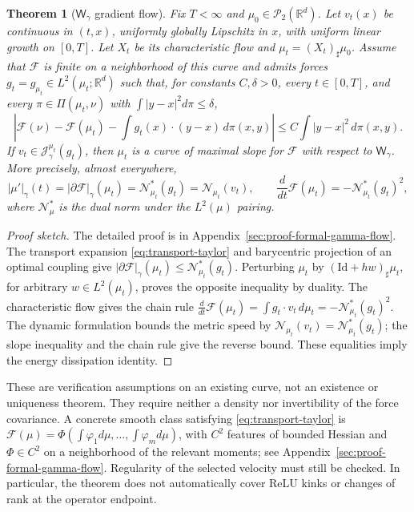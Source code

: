 \documentclass{article}
\newtheorem{theorem}{Theorem}[section]
\newenvironment{proofsketch}{\begin{proof}[Proof sketch]}{\end{proof}}
\newcommand{\R}{\mathbb{R}}
\newcommand{\cP}{\mathcal{P}}
\newcommand{\MF}{\mathcal{F}}
\newcommand{\MN}{\mathcal{N}}
\newcommand{\MJ}{\mathcal{J}}
\newcommand{\Wg}{\mathsf{W}_{\gamma}}
\newcommand{\Id}{\mathrm{Id}}
\begin{document}
\begin{theorem}[$\Wg$ gradient flow]
\label{prop:formalGF}
Fix $T<\infty$ and $\mu_0\in\cP_2(\R^d)$. Let $v_t(x)$ be continuous in
$(t,x)$, uniformly globally Lipschitz in $x$, with uniform linear growth on
$[0,T]$. Let $X_t$ be its characteristic flow and
$\mu_t=(X_t)_\sharp\mu_0$. Assume that $\MF$ is finite on a neighborhood of
this curve and admits forces $g_t=g_{\mu_t}\in L^2(\mu_t;\R^d)$ such that,
for constants $C,\delta>0$, every $t\in[0,T]$, and every
$\pi\in\Pi(\mu_t,\nu)$ with $\int|y-x|^2d\pi\le\delta$,
\begin{equation}\label{eq:transport-taylor}
 \left|\MF(\nu)-\MF(\mu_t)
       -\int g_t(x)\cdot(y-x)\,d\pi(x,y)\right|
 \le C\int|y-x|^2\,d\pi(x,y).
\end{equation}
If $v_t\in\MJ_\gamma^{\mu_t}(g_t)$, then $\mu_t$ is a curve of maximal
slope for $\MF$ with respect to $\Wg$. More precisely, almost everywhere,
\[
 |\mu'|_\gamma(t)=|\partial\MF|_\gamma(\mu_t)
 =\MN_{\mu_t}^*(g_t)=\MN_{\mu_t}(v_t),\qquad
 \frac{d}{dt}\MF(\mu_t)=-\MN_{\mu_t}^*(g_t)^2,
\]
where $\MN_\mu^*$ is the dual norm under the $L^2(\mu)$ pairing.
\end{theorem}


\begin{proofsketch}
The detailed proof is in Appendix~\ref{sec:proof-formal-gamma-flow}.
The transport expansion \eqref{eq:transport-taylor} and barycentric
projection of an optimal coupling give
$|\partial\MF|_\gamma(\mu_t)\le\MN_{\mu_t}^*(g_t)$.
Perturbing $\mu_t$ by $(\Id+hw)_\sharp\mu_t$, for arbitrary
$w\in L^2(\mu_t)$, proves the opposite inequality by duality.
The characteristic flow gives the chain rule
$\frac{d}{dt}\MF(\mu_t)=\int g_t\cdot v_t\,d\mu_t
=-\MN_{\mu_t}^*(g_t)^2$.
The dynamic formulation bounds the metric speed by
$\MN_{\mu_t}(v_t)=\MN_{\mu_t}^*(g_t)$; the slope inequality and the chain
rule give the reverse bound. These equalities imply the energy dissipation
identity.
\end{proofsketch}

These are verification assumptions on an existing curve, not an existence
or uniqueness theorem. They require neither a density nor invertibility of
the force covariance. A concrete smooth class satisfying
\eqref{eq:transport-taylor} is
$\MF(\mu)=\Phi(\int\varphi_1d\mu,\ldots,\int\varphi_md\mu)$,
with $C^2$ features of bounded Hessian and $\Phi\in C^2$ on a neighborhood
of the relevant moments; see Appendix~\ref{sec:proof-formal-gamma-flow}.
Regularity of the selected velocity must still be checked. In particular,
the theorem does not automatically cover ReLU kinks or changes of rank at
the operator endpoint.
\end{document}
